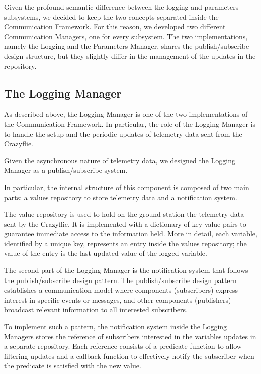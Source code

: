Given the profound semantic difference between the logging and parameters subsystems, we decided to keep the two concepts separated inside the Communication Framework.
For this reason, we developed two different Communication Managers, one for every subsystem. The two implementations, namely the Logging and the Parameters Manager, 
shares the publish/subscribe design structure, but they slightly differ in the management of the updates in the repository.

\subsection{The Logging Manager}\label{subsec:logging_manager}

As described above, the Logging Manager is one of the two implementations of the Communication Framework. 
In particular, the role of the Logging Manager is to handle the setup and the periodic updates of telemetry data sent from the Crazyflie.

Given the asynchronous nature of telemetry data, we designed the Logging Manager as a publish/subscribe system.

In particular, the internal structure of this component is composed of two main parts: a values repository to store telemetry data and a notification system.

The value repository is used to hold on the ground station the telemetry data sent by the Crazyflie.
It is implemented with a dictionary of key-value pairs to guarantee immediate access to the information held.
More in detail, each variable, identified by a unique key, represents an entry inside the values repository; the value of the entry is the last updated value of the logged variable.

The second part of the Logging Manager is the notification system that follows the publish/subscribe design pattern.
The publish/subscribe design pattern establishes a communication model where components (subscribers) express interest in specific events or messages, and other components (publishers) broadcast relevant information to all interested subscribers.

To implement such a pattern, the notification system inside the Logging Managers stores the reference of subscribers interested in the variables updates in a separate repository.
Each reference consists of a predicate function to allow filtering updates and a callback function to effectively notify the subscriber when the predicate is satisfied with the new value.

